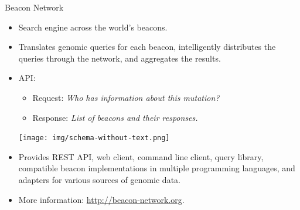 \documentclass{beamer}
\begin{document}
\begin{frame}[fragile]
\begin{columns}[T]
\begin{column}{.46\textwidth}
\begin{block}{Beacon Network\hfill{}}
\begin{itemize}
\item \color{brandeisblue}Search engine \color{black} across the world's beacons.
\item Translates genomic queries for each beacon, intelligently distributes the queries through the network, and aggregates the results.
\item API:
	\begin{itemize}
	\item Request: \textit{Who has information about this mutation?}
	\item Response: \textit{List of beacons and their responses.}
	\end{itemize}

\vspace{5mm}
\begin{center}
\texttt{[image: img/schema-without-text.png]}
\end{center}
\vspace{2mm}

\item Provides REST API, web client, command line client, query library, compatible beacon implementations in multiple programming languages, and adapters for various sources of genomic data.
\item More information: \url{http://beacon-network.org}.
\end{itemize}
\end{block}
\end{column}



\end{columns}
\end{frame}
\end{document}
